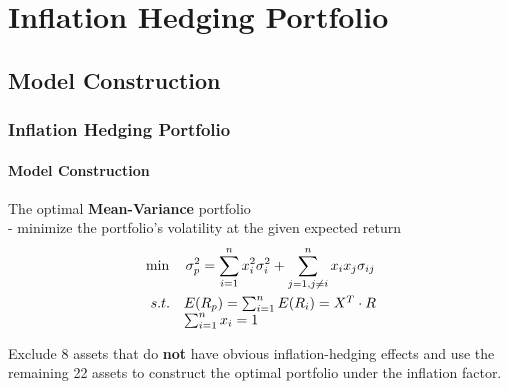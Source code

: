 \documentclass[
	11pt, %
]{beamer}
\begin{document}
\section{Inflation Hedging Portfolio}
\subsection{Model Construction}
\begin{frame}
\frametitle{Inflation Hedging Portfolio}
\framesubtitle{Model Construction}
The optimal \textbf{Mean-Variance} portfolio\\
\smallskip
- minimize the portfolio’s volatility at the given expected return\\
\begin{align*}
&\min \quad \sigma_{p}^{2}=\sum_{i=1}^{n} x_{i}^{2}\sigma_{i}^{2} + \sum_{j=1,j\neq i}^{n} x_{i}x_{j}\sigma_{ij} \\
& \begin{array}{r@{\quad}l@{}l@{\quad}l}
s.t.& E(R_{p})=\sum_{i=1}^{n}E(R_{i})=X^{T}\cdot R\\
&\sum_{i=1}^{n} x_{i}=1
\end{array}
\end{align*}

\begin{block}{}
Exclude 8 assets that do \textbf{not} have obvious inflation-hedging effects and use the remaining 22 assets to construct the optimal portfolio under the inflation factor.
\end{block}
\end{frame}
\end{document}
